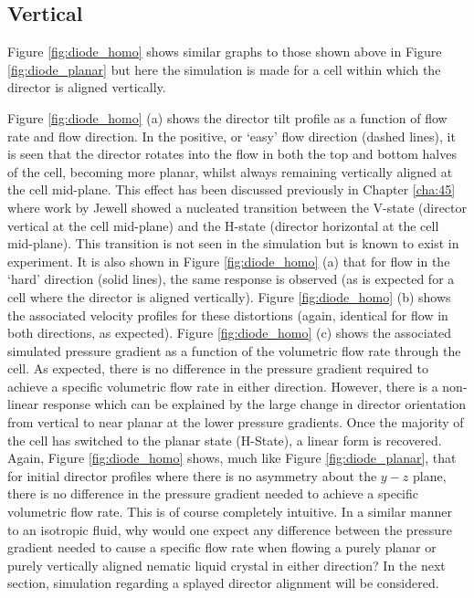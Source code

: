 \subsection{Vertical}
Figure \ref{fig:diode_homo} shows similar graphs to those shown above in Figure \ref{fig:diode_planar} but here the simulation is made for a cell  within which the director is aligned vertically.

Figure \ref{fig:diode_homo} (a) shows the director tilt profile as a function of flow rate and flow direction. In the positive, or `easy' flow direction (dashed lines), it is seen that the director rotates into the flow in both the top and bottom halves of the cell, becoming more planar, whilst always remaining vertically aligned at the cell mid-plane. This effect has been discussed previously in Chapter \ref{cha:45} where work by Jewell \cite{Jewell2009} showed a nucleated transition between the V-state (director vertical at the cell mid-plane) and the H-state (director horizontal at the cell mid-plane). This transition is not seen in the simulation but is known to exist in experiment. It is also shown in Figure \ref{fig:diode_homo} (a) that for flow in the `hard' direction (solid lines), the same response is observed (as is expected for a cell where the director is aligned vertically). Figure \ref{fig:diode_homo} (b) shows the associated velocity profiles for these distortions (again, identical for flow in both directions, as expected). Figure \ref{fig:diode_homo} (c) shows the associated simulated pressure gradient as a function of the volumetric flow rate through the cell. As expected, there is no difference in the pressure gradient required to achieve a specific volumetric flow rate in either direction. However, there is a non-linear response which can be explained by the large change in director orientation from vertical to near planar at the lower pressure gradients. Once the majority of the cell has switched to the planar state (H-State), a linear form is recovered. Again, Figure \ref{fig:diode_homo} shows, much like Figure \ref{fig:diode_planar}, that for initial director profiles where there is no asymmetry about the $y-z$ plane, there is no difference in the pressure gradient needed to achieve a specific volumetric flow rate. This is of course completely intuitive. In a similar manner to an isotropic fluid, why would one expect any difference between the pressure gradient needed to cause a specific flow rate when flowing a purely planar or purely vertically aligned nematic liquid crystal in either direction? In the next section, simulation regarding a splayed director alignment will be considered.

